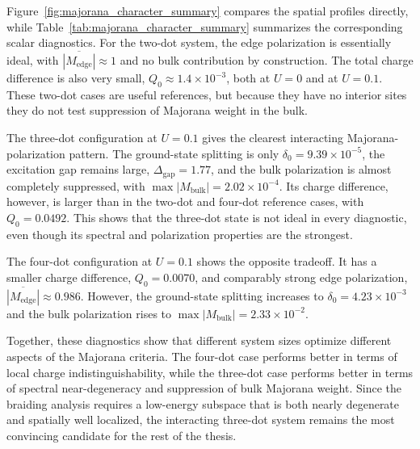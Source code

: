 \begin{table}
  \centering
  
  \caption{Summary of local diagnostics for the representative configurations shown in Fig.~\ref{fig:majorana_character_summary}. Here $\delta_0$ is the splitting of the lowest even-odd pair, $\Delta_{\mathrm{gap}}$ is the gap separating this pair from the next excited states, $Q_0$ is the total charge difference between the parity partners, $\overline{|M_{\mathrm{edge}}|}$ is the mean absolute Majorana polarization on the first and last sites, and $\max |M_{\mathrm{bulk}}|$ is the largest absolute polarization on the interior sites.}
  \label{tab:majorana_character_summary}
\end{table}

Figure~\ref{fig:majorana_character_summary} compares the spatial profiles directly, while Table~\ref{tab:majorana_character_summary} summarizes the corresponding scalar diagnostics. For the two-dot system, the edge polarization is essentially ideal, with $\overline{|M_{\mathrm{edge}}|}\approx 1$ and no bulk contribution by construction. The total charge difference is also very small, $Q_0\approx 1.4\times 10^{-3}$, both at $U=0$ and at $U=0.1$. These two-dot cases are useful references, but because they have no interior sites they do not test suppression of Majorana weight in the bulk.

The three-dot configuration at $U=0.1$ gives the clearest interacting Majorana-polarization pattern. The ground-state splitting is only $\delta_0=9.39\times 10^{-5}$, the excitation gap remains large, $\Delta_{\mathrm{gap}}=1.77$, and the bulk polarization is almost completely suppressed, with $\max |M_{\mathrm{bulk}}|=2.02\times 10^{-4}$. Its charge difference, however, is larger than in the two-dot and four-dot reference cases, with $Q_0=0.0492$. This shows that the three-dot state is not ideal in every diagnostic, even though its spectral and polarization properties are the strongest.

The four-dot configuration at $U=0.1$ shows the opposite tradeoff. It has a smaller charge difference, $Q_0=0.0070$, and comparably strong edge polarization, $\overline{|M_{\mathrm{edge}}|}\approx 0.986$. However, the ground-state splitting increases to $\delta_0=4.23\times 10^{-3}$ and the bulk polarization rises to $\max |M_{\mathrm{bulk}}|=2.33\times 10^{-2}$.

Together, these diagnostics show that different system sizes optimize different aspects of the Majorana criteria. The four-dot case performs better in terms of local charge indistinguishability, while the three-dot case performs better in terms of spectral near-degeneracy and suppression of bulk Majorana weight. Since the braiding analysis requires a low-energy subspace that is both nearly degenerate and spatially well localized, the interacting three-dot system remains the most convincing candidate for the rest of the thesis.

